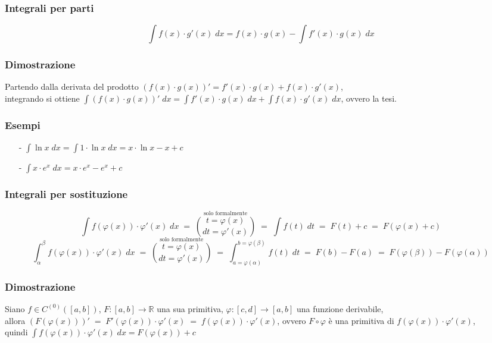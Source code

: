 \documentclass[a4paper]{article}
\newcommand\cont[2]{C^{(#1)} \left({#2}\right)}
\begin{document}
\subsubsection*{Integrali per parti}
\[\int f(x) \cdot g'(x) \; dx = f(x) \cdot g(x) - \int f'(x) \cdot g(x) \; dx\]

\subsubsection*{Dimostrazione}
Partendo dalla derivata del prodotto \((f(x) \cdot g(x))' = f'(x) \cdot g(x) + f(x) \cdot g'(x)\), \\
integrando si ottiene \(\displaystyle \int (f(x) \cdot g(x))' \; dx = \int f'(x) \cdot g(x) \; dx + \int f(x) \cdot g'(x) \; dx\), ovvero la tesi.

\subsubsection*{Esempi}
\begin{itemize}
	\item[-] \(\displaystyle \int \ln x \; dx = \int 1 \cdot \ln x \; dx = x \cdot \ln x - x + c\)
	\item[-] \(\displaystyle \int x \cdot e^x \; dx = x \cdot e^x - e^x + c\)
\end{itemize}

\subsubsection*{Integrali per sostituzione}
\[\int f(\varphi(x)) \cdot \varphi'(x) \; dx \; = \; \stackrel{\text{solo formalmente}}{\binom{t = \varphi (x)}{dt = \varphi'(x)}} \; = \; \int f(t) \; dt \; = \; F(t) + c \; = \; F(\varphi(x) + c)\]
\[\int_{\alpha}^{\beta} f(\varphi(x)) \cdot \varphi'(x) \; dx \; = \; \stackrel{\text{solo formalmente}}{\binom{t = \varphi (x)}{dt = \varphi'(x)}} \; = \; \int_{a = \varphi(\alpha)}^{b = \varphi(\beta)} f(t) \; dt \; = \; F(b) - F(a) \; = \; F(\varphi(\beta)) - F(\varphi(\alpha))\]

\subsubsection*{Dimostrazione}
Siano \(f \in \cont{0}{\left[a, b\right]}\), \(F:\left[a, b\right] \to \mathbb{R}\) una sua primitiva, \(\varphi:\left[c, d\right] \to \left[a, b\right]\) una funzione derivabile, \\
allora \((F(\varphi(x)))' \; = \; F'(\varphi(x)) \cdot \varphi'(x) \; = \; f(\varphi(x)) \cdot \varphi'(x)\), ovvero \(F \circ \varphi\) è una primitiva di \(f(\varphi(x)) \cdot \varphi'(x)\), \\
quindi \(\displaystyle \int f(\varphi(x)) \cdot \varphi'(x) \; dx = F(\varphi(x)) + c\)
\end{document}
